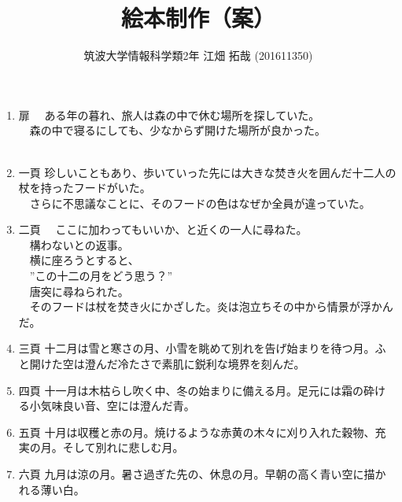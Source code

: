 \documentclass{tarticle}
\author{筑波大学情報科学類2年 江畑 拓哉 (201611350)}
\date{}
\title{絵本制作（案）}
\begin{document}
\maketitle
\begin{enumerate}
\item 扉
\label{sec:org8516d12}
\newline
　ある年の暮れ、旅人は森の中で休む場所を探していた。\\
　森の中で寝るにしても、少なからず開けた場所が良かった。\\
　\\
\item 一頁
\label{sec:org1a203a3}
\newline
  珍しいこともあり、歩いていった先には大きな焚き火を囲んだ十二人の杖を持ったフードがいた。\\
　さらに不思議なことに、そのフードの色はなぜか全員が違っていた。\\

\item 二頁
\label{sec:orgef6d68c}
\newline
　ここに加わってもいいか、と近くの一人に尋ねた。\\
　構わないとの返事。\\

　横に座ろうとすると、\\
　”この十二の月をどう思う？”\\
　唐突に尋ねられた。\\
　そのフードは杖を焚き火にかざした。炎は泡立ちその中から情景が浮かんだ。\\

\item 三頁
\label{sec:org2ea2a1f}
\newline
十二月は雪と寒さの月、小雪を眺めて別れを告げ始まりを待つ月。ふと開けた空は澄んだ冷たさで素肌に鋭利な境界を刻んだ。\\

\item 四頁
\label{sec:org970a842}
\newline
十一月は木枯らし吹く中、冬の始まりに備える月。足元には霜の砕ける小気味良い音、空には澄んだ青。\\

\item 五頁
\label{sec:org669f1f3}
\newline
十月は収穫と赤の月。焼けるような赤黄の木々に刈り入れた穀物、充実の月。そして別れに悲しむ月。\\

\item 六頁
\label{sec:org20ae208}
\newline
九月は涼の月。暑さ過ぎた先の、休息の月。早朝の高く青い空に描かれる薄い白。\\


\end{enumerate}
\end{document}
